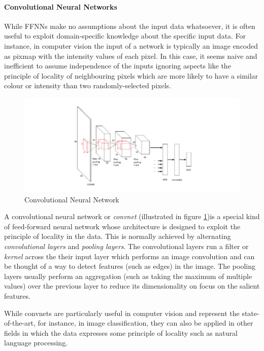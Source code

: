 \paragraph{Convolutional Neural Networks} While FFNNs make no assumptions about the input data whatsoever, it is often useful to exploit domain-specific knowledge about the specific input data. For instance, in computer vision the input of a network is typically an image encoded as pixmap with the intensity values of each pixel. In this case, it seems naive and inefficient to assume independence of the inputs ignoring aspects like the principle of locality of neighbouring pixels which are more likely to have a similar colour or intensity than two randomly-selected pixels. 
\begin{figure}[h]
	\centering
	\includegraphics[width=1\textwidth]{figures/chapter-2/convnet.png}
	\caption{Convolutional Neural Network}\label{fig:convnet}   
\end{figure}
A convolutional neural network or \emph{convnet} (illustrated in figure \ref{fig:convnet})is a special kind of feed-forward neural network whose architecture is designed to exploit the principle of locality in the data. This is normally achieved by alternating \emph{convolutional layers} and \emph{pooling layers}. The convolutional layers run a filter or \emph{kernel} across the their input layer which performs an image convolution and can be thought of a way to detect features (such as edges) in the image. The pooling layers usually perform an aggregation (such as taking the maximum of multiple values) over the previous layer to reduce its dimensionality on focus on the salient features.  

While convnets are particularly useful in computer vision and represent the state-of-the-art, for instance, in image classification, they can also be applied in other fields in which the data expresses some principle of locality such as natural language processing. 

